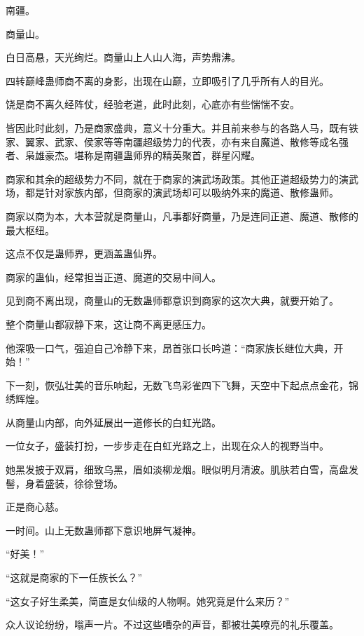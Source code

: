 
\begin{this_body}

南疆。

商量山。

白日高悬，天光绚烂。商量山上人山人海，声势鼎沸。

四转巅峰蛊师商不离的身影，出现在山巅，立即吸引了几乎所有人的目光。

饶是商不离久经阵仗，经验老道，此时此刻，心底亦有些惴惴不安。

皆因此时此刻，乃是商家盛典，意义十分重大。并且前来参与的各路人马，既有铁家、翼家、武家、侯家等等南疆超级势力的代表，亦有来自魔道、散修等成名强者、枭雄豪杰。堪称是南疆蛊师界的精英聚首，群星闪耀。

商家和其余的超级势力不同，就在于商家的演武场政策。其他正道超级势力的演武场，都是针对家族内部，但商家的演武场却可以吸纳外来的魔道、散修蛊师。

商家以商为本，大本营就是商量山，凡事都好商量，乃是连同正道、魔道、散修的最大枢纽。

这点不仅是蛊师界，更涵盖蛊仙界。

商家的蛊仙，经常担当正道、魔道的交易中间人。

见到商不离出现，商量山的无数蛊师都意识到商家的这次大典，就要开始了。

整个商量山都寂静下来，这让商不离更感压力。

他深吸一口气，强迫自己冷静下来，昂首张口长吟道：“商家族长继位大典，开始！”

下一刻，恢弘壮美的音乐响起，无数飞鸟彩雀四下飞舞，天空中下起点点金花，锦绣辉煌。

从商量山内部，向外延展出一道修长的白虹光路。

一位女子，盛装打扮，一步步走在白虹光路之上，出现在众人的视野当中。

她黑发披于双肩，细致乌黑，眉如淡柳龙烟。眼似明月清波。肌肤若白雪，高盘发髻，身着盛装，徐徐登场。

正是商心慈。

一时间。山上无数蛊师都下意识地屏气凝神。

“好美！”

“这就是商家的下一任族长么？”

“这女子好生柔美，简直是女仙级的人物啊。她究竟是什么来历？”

众人议论纷纷，嗡声一片。不过这些嘈杂的声音，都被壮美嘹亮的礼乐覆盖。


\end{this_body}
